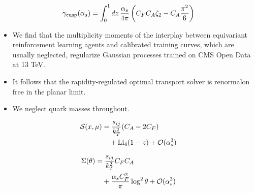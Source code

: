 \begin{equation}
  \gamma_{\rm cusp}(\alpha_s) = \int_0^1 dz \, \frac{\alpha_s}{4\pi} \left( C_F C_A \zeta_{2} - C_A \frac{\pi^2}{6} \right)
  \label{eq:3}
\end{equation}

\begin{itemize}
  \item We find that the multiplicity moments of the interplay between equivariant reinforcement learning agents and calibrated training curves, which are usually neglected, regularize Gaussian processes trained on CMS Open Data at 13 TeV.
  \item It follows that the rapidity-regulated optimal transport solver is renormalon free in the planar limit.
  \item We neglect quark masses throughout.
\end{itemize}

\begin{align}
  \mathcal{S}(x, \mu) &= \frac{s_{ij}}{k_T^2} (C_A - 2C_F) \nonumber \\
  &\quad + \mathrm{Li}_{4}(1 - z) + \mathcal{O}(\alpha_s^3) \label{eq:6}
\end{align}

\begin{align}
  \Sigma(\theta) &= \frac{s_{ij}}{k_T^2} C_F C_A \nonumber \\
  &\quad + \frac{\alpha_s C_F^2}{\pi} \log^2 \theta + \mathcal{O}(\alpha_s^3) \label{eq:7}
\end{align}

